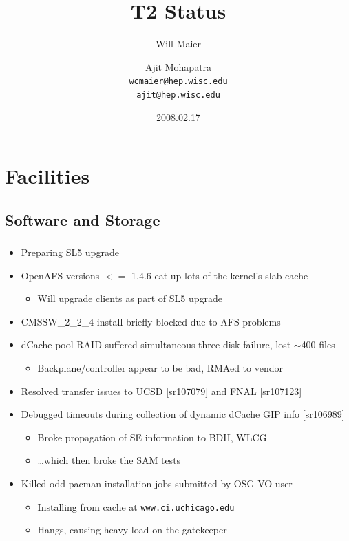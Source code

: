 \documentclass{beamer}
\title{T2 Status}
\author[Maier, Mohapatra]{
    Will Maier \and Ajit Mohapatra\\ 
    {\tt wcmaier@hep.wisc.edu}\\
    {\tt ajit@hep.wisc.edu}}
\institute[Wisconsin]{University of Wisconsin - High Energy Physics}
\date{2008.02.17}
\newcommand{\ca}{\ensuremath{\sim}}
\begin{document}
\begin{frame}
    \titlepage
\end{frame}


\section{Facilities}
\subsection{Software and Storage}
\begin{frame}
\frametitle{}
\begin{itemize}
    \item Preparing SL5 upgrade
    \item OpenAFS versions $<=$ 1.4.6 eat up lots of the kernel's slab cache
    \begin{itemize}
        \item Will upgrade clients as part of SL5 upgrade
    \end{itemize}
    \item CMSSW\_2\_2\_4 install briefly blocked due to AFS problems
    \item dCache pool RAID suffered simultaneous three disk failure, lost \ca{}400 files
    \begin{itemize}
        \item Backplane/controller appear to be bad, RMAed to vendor
    \end{itemize}
    \item Resolved transfer issues to UCSD [sr107079] and FNAL [sr107123]
    \item Debugged timeouts during collection of dynamic dCache GIP info [sr106989]
    \begin{itemize}
        \item Broke propagation of SE information to BDII, WLCG
        \item \ldots{}which then broke the SAM tests
    \end{itemize}
    \item Killed odd pacman installation jobs submitted by OSG VO user
    \begin{itemize}
        \item Installing from cache at {\tt www.ci.uchicago.edu}
        \item Hangs, causing heavy load on the gatekeeper
    \end{itemize}
\end{itemize}
\end{frame}
\end{document}
